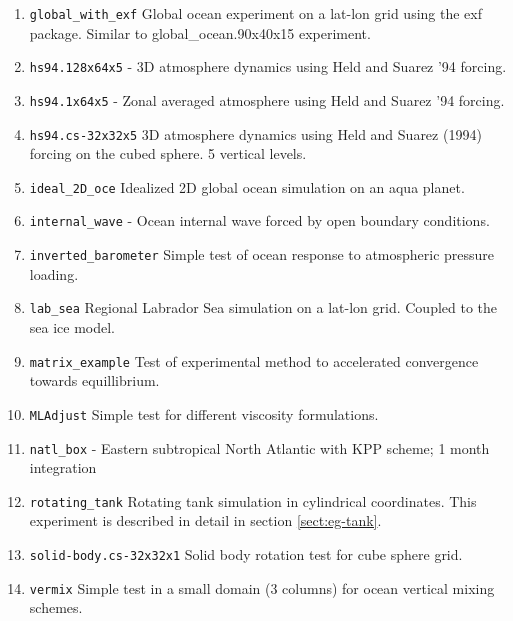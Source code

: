 \begin{enumerate}
\item \texttt{global\_with\_exf} Global ocean experiment on a lat-lon
  grid using the exf package. Similar to global\_ocean.90x40x15
  experiment.

\item \texttt{hs94.128x64x5} - 3D atmosphere dynamics using Held and
  Suarez '94 forcing.
  
\item \texttt{hs94.1x64x5} - Zonal averaged atmosphere using Held and
  Suarez '94 forcing.
  
\item \texttt{hs94.cs-32x32x5} 3D atmosphere dynamics using Held and
  Suarez (1994) forcing on the cubed sphere. 5 vertical levels.

\item \texttt{ideal\_2D\_oce} Idealized 2D global ocean simulation on
  an aqua planet.

\item \texttt{internal\_wave} - Ocean internal wave forced by open
  boundary conditions.

\item \texttt{inverted\_barometer} Simple test of ocean response to
  atmospheric pressure loading.

\item \texttt{lab\_sea} Regional Labrador Sea simulation on a lat-lon
  grid. Coupled to the sea ice model.

\item \texttt{matrix\_example} Test of experimental method to
  accelerated convergence towards equillibrium.

\item \texttt{MLAdjust} Simple test for different viscosity formulations.

\item \texttt{natl\_box} - Eastern subtropical North Atlantic with KPP
  scheme; 1 month integration
  
\item \texttt{rotating\_tank} Rotating tank simulation in cylindrical
  coordinates.  This experiment is described in detail in section
  \ref{sect:eg-tank}.

\item \texttt{solid-body.cs-32x32x1} Solid body rotation test for cube
  sphere grid.

\item \texttt{vermix} Simple test in a small domain (3 columns) for
  ocean vertical mixing schemes.

\end{enumerate}

